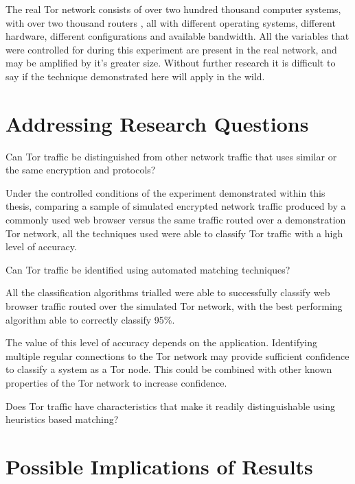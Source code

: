The real Tor network consists of over two hundred thousand computer systems,
with over two thousand routers \parencite{TorStatus:2011fk}, all with different
operating systems, different hardware, different configurations and available
bandwidth. All the variables that were controlled for during this experiment
are present in the real network, and may be amplified by it's greater size.
Without further research it is difficult to say if the technique demonstrated
here will apply in the wild.

\section{Addressing Research Questions}

\begin{enumerate*}
  \item{Can Tor traffic be distinguished from other network traffic that uses
    similar or the same encryption and protocols?}

    Under the controlled conditions of the experiment demonstrated within this
    thesis, comparing a sample of simulated encrypted network traffic produced
    by a commonly used web browser versus the same traffic routed over a
    demonstration Tor network, all the techniques used were able to classify
    Tor traffic with a high level of accuracy.

  \item{Can Tor traffic be identified using automated matching techniques?}

    All the classification algorithms trialled were able to successfully classify
    web browser traffic routed over the simulated Tor network, with the best
    performing algorithm able to correctly classify 95\%.

    The value of this level of accuracy depends on the application. Identifying
    multiple regular connections to the Tor network may provide sufficient
    confidence to classify a system as a Tor node. This could be combined with
    other known properties of the Tor network to increase confidence.

  \item{Does Tor traffic have characteristics that make it readily distinguishable using
    heuristics based matching?}



\end{enumerate*}


\section{Possible Implications of Results}

